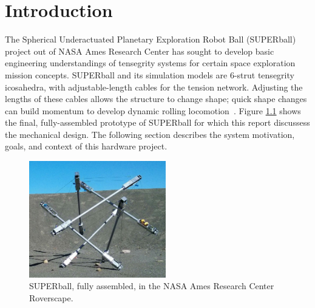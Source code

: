 \documentclass[12pt]{report}
\begin{document}

\chapter{Introduction}

The Spherical Underactuated Planetary Exploration Robot Ball (SUPERball) project out of NASA Ames Research Center has sought to develop basic engineering understandings of tensegrity systems for certain space exploration mission concepts.
SUPERball and its simulation models are 6-strut tensegrity icosahedra, with adjustable-length cables for the tension network.
Adjusting the lengths of these cables allows the structure to change shape; quick shape changes can build momentum to develop dynamic rolling locomotion~\cite{Iscen2013,iscen2014flop}.
Figure \ref{fig:overview} shows the final, fully-assembled prototype of SUPERball for which this report discussess the mechanical design.
The following section describes the system motivation, goals, and context of this hardware project.

\begin{figure}
  \begin{center}
  \vspace{-0.5cm}
    \includegraphics[width=0.53\textwidth]{img/superball_roverscape2_cropped.jpg}
    \caption{SUPERball, fully assembled, in the NASA Ames Research Center Roverscape.}
    \label{fig:overview}
  \end{center}
  \vspace{-0.7cm}
\end{figure}
\end{document}

